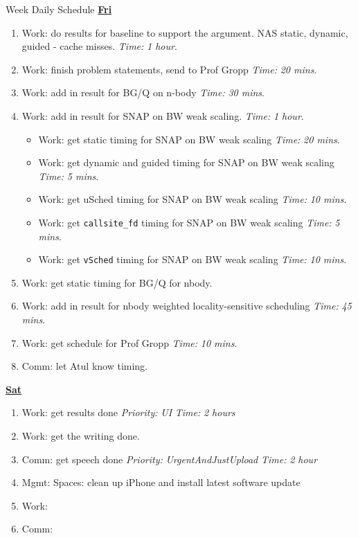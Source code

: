 \documentclass[serif, mathserif, final]{beamer}
\newcommand{\timeEst}[1]{\textit{Time:} \textit{#1}}
\newcommand{\priority}[1]{\textit{Priority:} \textit{#1}}
\begin{document}
\begin{frame}{}
\begin{columns}
\begin{column}{0.50\linewidth}
\begin{block}{Week Daily Schedule}
\textbf{\small {\underline{Fri}}} 
\begin{enumerate} 
\tiny \item \tiny Work: do results for baseline to support the argument. NAS static, dynamic, guided - cache misses.  \timeEst{1 hour}. 
\item \tiny Work: finish problem statements, send to Prof Gropp \timeEst{20 mins}. 
\item \tiny Work: add in result for BG/Q on n-body \timeEst{30 mins}. 
\item \tiny Work: add in result for SNAP on BW  weak scaling. \timeEst{1 hour}. 
\begin{itemize} 
\item \tiny Work: get static timing for SNAP on BW weak scaling \timeEst{20 mins}.
\item \tiny Work: get dynamic and guided timing for SNAP on BW weak scaling \timeEst{5 mins}.
\item \tiny Work: get uSched timing for SNAP on BW weak scaling \timeEst{10 mins}. 
\item \tiny Work: get \texttt{callsite\_fd} timing for SNAP on BW weak scaling \timeEst{5 mins}. 
\item \tiny Work: get \texttt{vSched} timing for SNAP on BW weak scaling \timeEst{10 mins}. 
\end{itemize} 

\item \tiny Work: get static timing for BG/Q for nbody. 
\item \tiny Work: add in result for nbody weighted locality-sensitive scheduling \timeEst{45 mins}.
\item \tiny Work: get schedule for Prof Gropp \timeEst{10 mins}. 
\item \tiny Comm: let Atul know timing. 
\end{enumerate}

\textbf{\small \underline{Sat}} 
\begin{enumerate} 
\tiny \item \tiny Work: get results done \priority{UI} \timeEst{2 hours} 
\tiny \item \tiny Work: get the writing done. 
\item \tiny Comm: get speech done \priority{UrgentAndJustUpload} \timeEst{2 hour}
\item \tiny Mgmt: Spaces: clean up iPhone and install latest software update 
\item \tiny Work:
\item \tiny Comm: 
\end{enumerate} 


\end{block}
\end{column}
\end{columns}
\end{frame}
\end{document}
